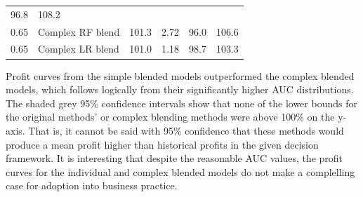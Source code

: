 \documentclass[]{elsarticle} %
\begin{document}
\begin{longtable}[]{@{}llllll@{}}
\begin{minipage}[t]{0.16\columnwidth}
96.8\strut
\end{minipage} & \begin{minipage}[t]{0.16\columnwidth}\raggedright\strut
108.2\strut
\end{minipage}\tabularnewline
\begin{minipage}[t]{0.08\columnwidth}\raggedright\strut
0.65\strut
\end{minipage} & \begin{minipage}[t]{0.14\columnwidth}\raggedright\strut
Complex RF blend\strut
\end{minipage} & \begin{minipage}[t]{0.16\columnwidth}\raggedright\strut
101.3\strut
\end{minipage} & \begin{minipage}[t]{0.14\columnwidth}\raggedright\strut
2.72\strut
\end{minipage} & \begin{minipage}[t]{0.16\columnwidth}\raggedright\strut
96.0\strut
\end{minipage} & \begin{minipage}[t]{0.16\columnwidth}\raggedright\strut
106.6\strut
\end{minipage}\tabularnewline
\begin{minipage}[t]{0.08\columnwidth}\raggedright\strut
0.65\strut
\end{minipage} & \begin{minipage}[t]{0.14\columnwidth}\raggedright\strut
Complex LR blend\strut
\end{minipage} & \begin{minipage}[t]{0.16\columnwidth}\raggedright\strut
101.0\strut
\end{minipage} & \begin{minipage}[t]{0.14\columnwidth}\raggedright\strut
1.18\strut
\end{minipage} & \begin{minipage}[t]{0.16\columnwidth}\raggedright\strut
98.7\strut
\end{minipage} & \begin{minipage}[t]{0.16\columnwidth}\raggedright\strut
103.3\strut
\end{minipage}\tabularnewline
\bottomrule
\end{longtable}

Profit curves from the simple blended models outperformed the complex
blended models, which follows logically from their significantly higher
AUC distributions. The shaded grey 95\% confidence intervals show that
none of the lower bounds for the original methods' or complex blending
methods were above 100\% on the y-axis. That is, it cannot be said with
95\% confidence that these methods would produce a mean profit higher
than historical profits in the given decision framework. It is
interesting that despite the reasonable AUC values, the profit curves
for the individual and complex blended models do not make a complelling
case for adoption into business practice.
\end{document}
